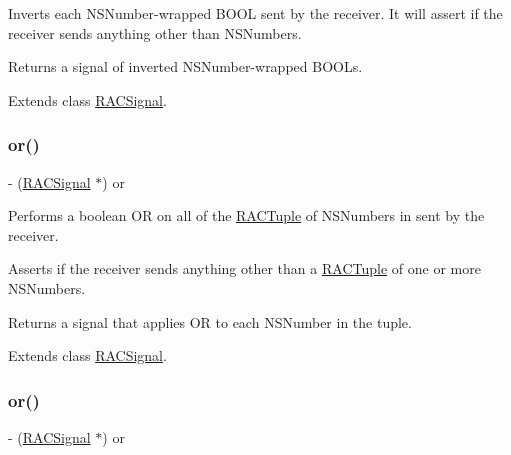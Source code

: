 Inverts each N\+S\+Number-\/wrapped B\+O\+OL sent by the receiver. It will assert if the receiver sends anything other than N\+S\+Numbers.

Returns a signal of inverted N\+S\+Number-\/wrapped B\+O\+O\+Ls. 

Extends class \mbox{\hyperlink{interface_r_a_c_signal_a53de1c418b57ee4c60d20f561db04717}{R\+A\+C\+Signal}}.

\mbox{\label{category_r_a_c_signal_07_operations_08_aaf19b8314c8e554a7e5140ebffcd4f98}} 
\subsubsection{\texorpdfstring{or()}{or()}\hspace{0.1cm}{\footnotesize\ttfamily [1/3]}}
{\footnotesize\ttfamily -\/ (\mbox{\hyperlink{interface_r_a_c_signal}{R\+A\+C\+Signal}} $\ast$) or \begin{DoxyParamCaption}{ }\end{DoxyParamCaption}}

Performs a boolean OR on all of the \mbox{\hyperlink{interface_r_a_c_tuple}{R\+A\+C\+Tuple}} of N\+S\+Numbers in sent by the receiver.

Asserts if the receiver sends anything other than a \mbox{\hyperlink{interface_r_a_c_tuple}{R\+A\+C\+Tuple}} of one or more N\+S\+Numbers.

Returns a signal that applies OR to each N\+S\+Number in the tuple. 

Extends class \mbox{\hyperlink{interface_r_a_c_signal_aaf19b8314c8e554a7e5140ebffcd4f98}{R\+A\+C\+Signal}}.

\mbox{\label{category_r_a_c_signal_07_operations_08_aaf19b8314c8e554a7e5140ebffcd4f98}} 
\subsubsection{\texorpdfstring{or()}{or()}\hspace{0.1cm}{\footnotesize\ttfamily [2/3]}}
{\footnotesize\ttfamily -\/ (\mbox{\hyperlink{interface_r_a_c_signal}{R\+A\+C\+Signal}} $\ast$) or \begin{DoxyParamCaption}{ }\end{DoxyParamCaption}}


